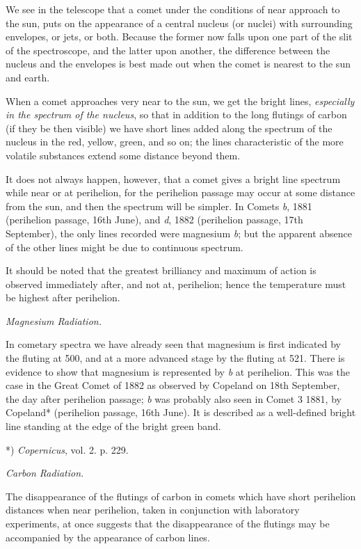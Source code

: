 \documentclass[a4paper, 12pt, oneside, polutonikogreek, english]{article}
\begin{document}
We see in the telescope that a comet under the conditions of near approach to the sun, puts on the appearance of a central nucleus (or nuclei) with surrounding envelopes, or jets, or both. Because the former now falls upon one part of the slit of the spectroscope, and the latter upon another, the difference between the nucleus and the envelopes is best made out when the comet is nearest to the sun and earth.

When a comet approaches very near to the sun, we get the bright lines, \emph{especially in the spectrum of the nucleus}, so that in addition to the long flutings of carbon (if they be then visible) we have short lines added along the spectrum of the nucleus in the red, yellow, green, and so on; the lines characteristic of the more volatile substances extend some distance beyond them.

It does not always happen, however, that a comet gives a bright line spectrum while near or at perihelion, for the perihelion passage may occur at some distance from the sun, and then the spectrum will be simpler. In Comets \emph{b}, 1881 (perihelion passage, 16th June), and \emph{d}, 1882 (perihelion passage, 17th September), the only lines recorded were magnesium \emph{b}; but the apparent absence of the other lines might be due to continuous spectrum.

It should be noted that the greatest brilliancy and maximum of action is observed immediately after, and not at, perihelion; hence the temperature must be highest after perihelion.

\emph{Magnesium Radiation.}

In cometary spectra we have already seen that magnesium is first indicated by the fluting at 500, and at a more advanced stage by the fluting at 521. There is evidence to show that magnesium is represented by \emph{b} at perihelion. This was the case in the Great Comet of 1882 as observed by Copeland on 18th September, the day after perihelion passage; \emph{b} was probably also seen in Comet 3 1881, by Copeland* (perihelion passage, 16th June). It is described as a well-defined bright line standing at the edge of the bright green band.

*) \emph{Copernicus}, vol. 2. p. 229.

\emph{Carbon Radiation.}

The disappearance of the flutings of carbon in comets which have short perihelion distances when near perihelion, taken in conjunction with laboratory experiments, at once suggests that the disappearance of the flutings may be accompanied by the appearance of carbon lines.
\end{document}
